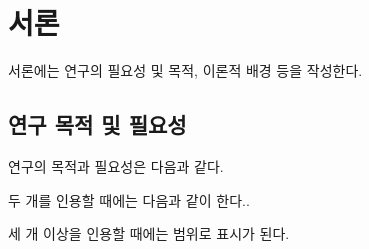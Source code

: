\section{서론}
서론에는 연구의 필요성 및 목적, 이론적 배경 등을 작성한다.

\subsection{연구 목적 및 필요성}
연구의 목적과 필요성은 다음과 같다\cite{taylor1989}.

두 개를 인용할 때에는 다음과 같이 한다.\cite{aksin2006,gillies1933}.

세 개 이상을 인용할 때에는 범위로 표시가 된다\cite{taylor1989,aksin2006,gillies1933}.
